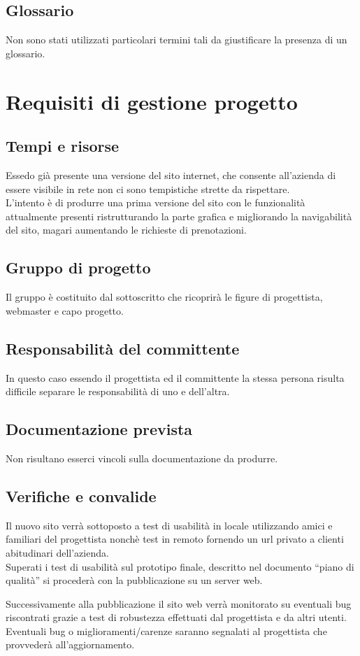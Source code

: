 \documentclass[a4paper,12pt,hidelinks]{report}
\begin{document}
\section{Glossario}
  Non sono stati utilizzati particolari termini tali da giustificare la presenza di un glossario.


\chapter{Requisiti di gestione progetto}

\section{Tempi e risorse}
  Essedo già presente una versione del sito internet, che consente all'azienda di essere visibile in rete non ci sono tempistiche strette da rispettare. 
  \\ L'intento è di produrre una prima versione del sito con le funzionalità attualmente presenti ristrutturando la parte grafica e migliorando la navigabilità del sito, 
  magari aumentando le richieste di prenotazioni.

\section{Gruppo di progetto}
  Il gruppo è costituito dal sottoscritto che ricoprirà le figure di progettista, webmaster e capo progetto.

\section{Responsabilità del committente}
  In questo caso essendo il progettista ed il committente la stessa persona risulta difficile separare le responsabilità di uno e dell'altra.

\section{Documentazione prevista}
  Non risultano esserci vincoli sulla documentazione da produrre.

\section{Verifiche e convalide}
  Il nuovo sito verrà sottoposto a test di usabilità in locale utilizzando amici e familiari del progettista nonchè test in remoto fornendo un url privato 
  a clienti abitudinari dell'azienda.
  \\Superati i test di usabilità sul prototipo finale, descritto nel documento ``piano di qualità'' si procederà con la pubblicazione 
  su un server web.
  \par Successivamente alla pubblicazione il sito web verrà monitorato su eventuali bug riscontrati grazie a test di robustezza effettuati dal progettista e da altri utenti. 
  \\ Eventuali bug o miglioramenti/carenze saranno segnalati al progettista che provvederà all'aggiornamento.
\end{document}

